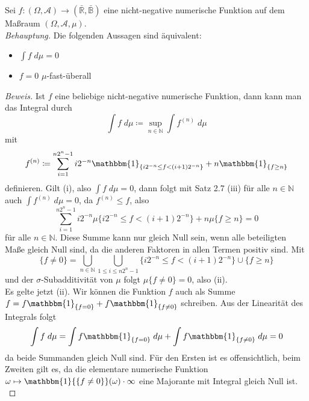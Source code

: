 \documentclass[10pt]{article}
\newcommand{\beh}{\textit{Behauptung. }}
\newenvironment{Aufgabe}[2][Aufgabe]{\begin{trivlist}
\item[\hskip \labelsep {\bfseries #1}\hskip \labelsep {\bfseries #2.}]}{\end{trivlist}}
\begin{document}
\begin{Aufgabe}{3}
Sei $f:(\Omega, \mathcal{A}) \rightarrow (\bar{\mathbb{R}}, \bar{\mathbb{B}})$ eine nicht-negative numerische Funktion auf dem Maßraum $(\Omega, \mathcal{A}, \mu)$. \\

\beh 
Die folgenden Aussagen sind äquivalent:

\begin{itemize}
	\item[(i)]  $\int f \; d\mu = 0$ 
	\item[(ii)]  $f = 0$ $\mu$-fast-überall 
\end{itemize}
\end{Aufgabe}

\begin{proof}[Beweis]

Ist $f$ eine beliebige nicht-negative numerische Funktion, dann kann man das Integral durch
$$
\int f \; d\mu \coloneqq \sup_{n \in \mathbb{N}} \int f^{(n)} \; d\mu
$$
mit
$$
f^{(n)} \coloneqq  \sum_{i=1}^{n2^n-1} i2^{-n} \mathbbm{1}_{\{i2^{-n} \leq f < (i+1)2^{-n}\}} + n\mathbbm{1}_{\{f \geq n\}}
$$
definieren.
Gilt (i), also $\int f \; d\mu = 0$, dann folgt mit Satz 2.7 (iii) für alle $n \in \mathbb{N}$ auch $\int f^{(n)} \; d\mu = 0$, da $f^{(n)} \leq f$, also 
$$
\sum_{i=1}^{n2^n-1} i2^{-n} \mu\{i2^{-n} \leq f < (i+1)2^{-n}\} + n\mu\{f \geq n\} =  0
$$ 
für alle $n \in \mathbb{N}$. Diese Summe kann nur gleich Null sein, wenn alle beteiligten Maße gleich Null sind, da die anderen Faktoren in allen Termen positiv sind. Mit
$$
\{f \neq 0\} = \bigcup_{n \in \mathbb{N}} \bigcup_{1 \leq i \leq n2^n-1} \{i2^{-n} \leq f < (i+1)2^{-n}\} \cup \{f \geq n\}
$$ 
und der $\sigma$-Subadditivität von $\mu$ folgt $\mu\{f \neq 0\} = 0$, also (ii). \\
Es gelte jetzt (ii). Wir können die Funktion $f$ auch als Summe $f = f\mathbbm{1}_{\{f = 0\}} + f\mathbbm{1}_{\{f \neq 0\}}$ schreiben. Aus der Linearität des Integrals folgt
$$
\int f \; d\mu = \int f\mathbbm{1}_{\{f = 0\}} \; d\mu + \int f\mathbbm{1}_{\{f \neq 0\}} \; d\mu = 0
$$
da beide Summanden gleich Null sind. Für den Ersten ist es offensichtlich, beim Zweiten gilt es, da die elementare numerische Funktion $\omega \mapsto \mathbbm{1}{\{f \neq 0\}}(\omega) \cdot \infty$ eine Majorante mit Integral gleich Null ist. \\
\end{proof} 
\end{document}
